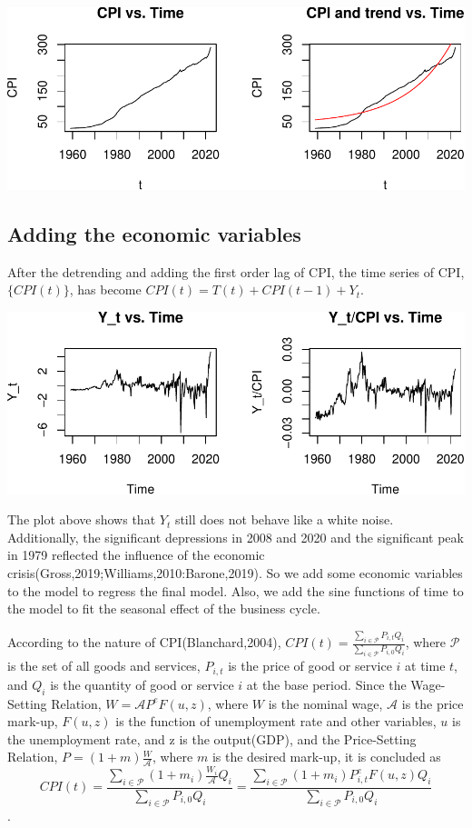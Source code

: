 \documentclass[
  man,floatsintext,
  man]{apa6}
\begin{document}
\includegraphics{stat429_group2_final_proj_files/figure-latex/unnamed-chunk-1-1.pdf}

\hypertarget{adding-the-economic-variables}{%
\subsection{Adding the economic variables}\label{adding-the-economic-variables}}

After the detrending and adding the first order lag of CPI, the time series of CPI, \(\{CPI(t)\}\), has become \(CPI(t) = T(t) + CPI(t-1) + Y_t\).

\includegraphics{stat429_group2_final_proj_files/figure-latex/unnamed-chunk-2-1.pdf}

The plot above shows that \(Y_t\) still does not behave like a white noise.
Additionally, the significant depressions in 2008 and 2020 and the significant peak in 1979 reflected the influence of the economic crisis(Gross,2019;Williams,2010:Barone,2019).
So we add some economic variables to the model to regress the final model.
Also, we add the sine functions of time to the model to fit the seasonal effect of the business cycle.

According to the nature of CPI(Blanchard,2004), \(CPI(t) = \frac{\sum_{i \in \mathcal{P}} P_{i,t} Q_i}{\sum_{i \in \mathcal{P}} P_{i,0} Q_i}\), where \(\mathcal{P}\) is the set of all goods and services, \(P_{i,t}\) is the price of good or service \(i\) at time \(t\), and \(Q_i\) is the quantity of good or service \(i\) at the base period.
Since the Wage-Setting Relation, \(W = \mathcal{A} P^e F(u,z)\), where \(W\) is the nominal wage, \(\mathcal{A}\) is the price mark-up, \(F(u,z)\) is the function of unemployment rate and other variables, \(u\) is the unemployment rate, and z is the output(GDP), and the Price-Setting Relation, \(P = (1+m)\frac{W}{\mathcal{A}}\), where \(m\) is the desired mark-up,
it is concluded as
\[CPI(t) = \frac{\sum_{i \in \mathcal{P}} (1+m_i) \frac{W_i}{\mathcal{A}} Q_i}{\sum_{i \in \mathcal{P}} P_{i,0} Q_i} = \frac{\sum_{i \in \mathcal{P}} (1+m_i) P_{i,t}^e F(u,z) Q_i}{\sum_{i \in \mathcal{P}} P_{i,0} Q_i}\].
\end{document}
